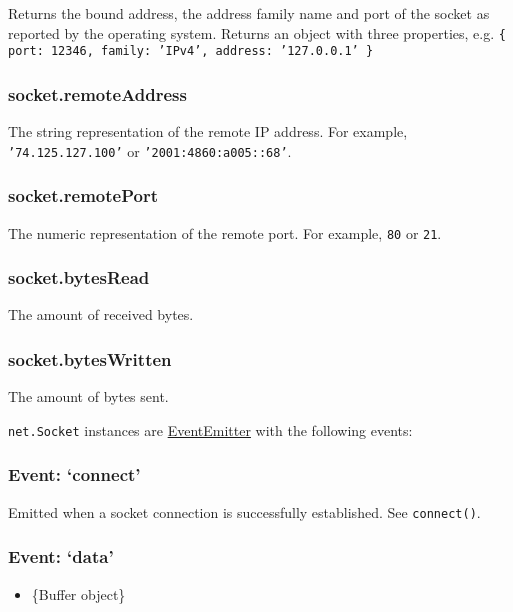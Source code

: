 Returns the bound address, the address family name and port of the
socket as reported by the operating system. Returns an object with three
properties, e.g.
\texttt{\{ port: 12346, family: 'IPv4', address: '127.0.0.1' \}}

\subsubsection{socket.remoteAddress}

The string representation of the remote IP address. For example,
\texttt{'74.125.127.100'} or \texttt{'2001:4860:a005::68'}.

\subsubsection{socket.remotePort}

The numeric representation of the remote port. For example, \texttt{80}
or \texttt{21}.

\subsubsection{socket.bytesRead}

The amount of received bytes.

\subsubsection{socket.bytesWritten}

The amount of bytes sent.

\texttt{net.Socket} instances are
\href{events.html\#events\_class\_events\_eventemitter}{EventEmitter}
with the following events:

\subsubsection{Event: `connect'}

Emitted when a socket connection is successfully established. See
\texttt{connect()}.

\subsubsection{Event: `data'}

\begin{itemize}
\item
  \{Buffer object\}
\end{itemize}

